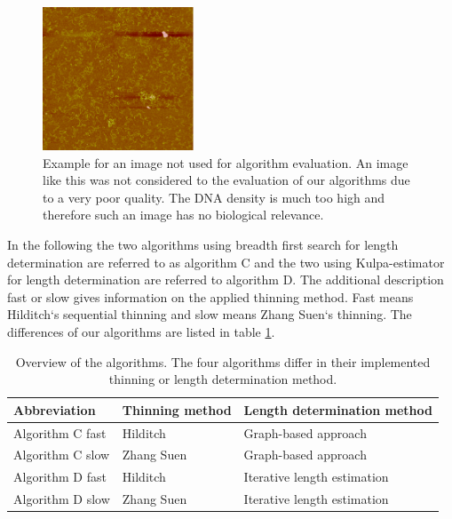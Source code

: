 \documentclass{article}
\begin{document}
\begin{figure}[!htb]
	\begin{center}
		\includegraphics[width = 0.4\textwidth]{validation8}
	\end{center}
	\caption{Example for an image not used for algorithm evaluation. An image like this was not considered to the evaluation of our algorithms due to a very poor quality. The DNA density is much too high and therefore such an image has no biological relevance.}
	\label{fig: validation8} %
\end{figure}



In the following the two algorithms using breadth first search for length determination are referred to as algorithm C and the two using Kulpa-estimator for length determination are referred to algorithm D. The additional description fast or slow gives information on the applied thinning method. Fast means Hilditch‘s sequential thinning and slow means Zhang Suen‘s thinning. The differences of our algorithms are listed in table \ref{tab:validation_table1}.

\begin{table}[!htbp]
	\centering
	\caption{Overview of the algorithms. The four algorithms differ in their implemented thinning or length determination method.}
	\begin{tabular*}{\textwidth}{lll} \hline
		
		\textbf{Abbreviation} & \textbf{Thinning method} & \textbf{Length determination method} \\ \hline
		
		Algorithm C fast & Hilditch & Graph-based approach \\
		Algorithm C slow & Zhang Suen & Graph-based approach \\
		Algorithm D fast & Hilditch & Iterative length estimation \\
		Algorithm D slow & Zhang Suen & Iterative length estimation \\ \hline
		
	\end{tabular*}%
	\label{tab:validation_table1}%
\end{table}%
\end{document}
